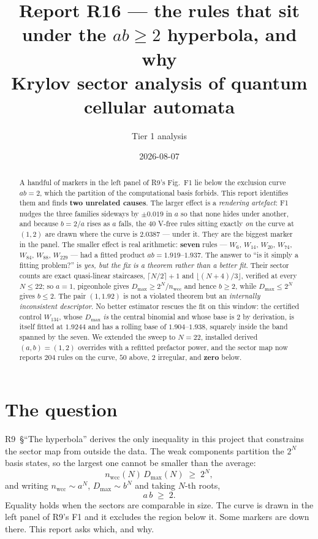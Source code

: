 \documentclass[11pt]{article}
\title{\textbf{Report R16 --- the rules that sit under the $ab\ge2$ hyperbola,
and why}\\
\large Krylov sector analysis of quantum cellular automata}
\author{Tier 1 analysis}
\date{2026-08-07}
\newcommand{\wcc}{\mathrm{wcc}}
\theoremstyle{plain}
\begin{document}
\maketitle

\begin{abstract}
A handful of markers in the left panel of R9's Fig.~F1 lie below the exclusion
curve $ab=2$, which the partition of the computational basis forbids. This report
identifies them and finds \textbf{two unrelated causes}. The larger effect is a
\emph{rendering artefact}: F1 nudges the three families sideways by $\pm0.019$ in
$a$ so that none hides under another, and because $b=2/a$ rises as $a$ falls, the
$40$ V-free rules sitting exactly \emph{on} the curve at $(1,2)$ are drawn where
the curve is $2.0387$ --- under it. They are the biggest marker in the panel. The
smaller effect is real arithmetic: \textbf{seven} rules --- $W_6$, $W_{14}$,
$W_{20}$, $W_{74}$, $W_{84}$, $W_{88}$, $W_{229}$ --- had a fitted product
$ab=1.919$--$1.937$. The answer to ``is it simply a fitting problem?'' is
\emph{yes, but the fix is a theorem rather than a better fit}. Their sector
counts are exact quasi-linear staircases, $\lceil N/2\rceil+1$ and
$\lfloor(N+4)/3\rfloor$, verified at every $N\le22$; so $a=1$, pigeonhole gives
$D_{\max}\ge2^N/n_\wcc$ and hence $b\ge2$, while $D_{\max}\le2^N$ gives $b\le2$.
The pair $(1,1.92)$ is not a violated theorem but an \emph{internally
inconsistent descriptor}. No better estimator rescues the fit on this window: the
certified control $W_{134}$, whose $D_{\max}$ \emph{is} the central binomial and
whose base is $2$ by derivation, is itself fitted at $1.9244$ and has a rolling
base of $1.904$--$1.938$, squarely inside the band spanned by the seven. We
extended the sweep to $N=22$, installed derived $(a,b)=(1,2)$ overrides with a
refitted prefactor power, and the sector map now reports $204$ rules on the
curve, $50$ above, $2$ irregular, and \textbf{zero} below.
\end{abstract}

\tableofcontents

\section{The question}

R9~\S``The hyperbola'' derives the only inequality in this project that
constrains the sector map from outside the data. The weak components partition
the $2^N$ basis states, so the largest one cannot be smaller than the average:
\begin{equation}
n_\wcc(N)\,D_{\max}(N)\;\ge\;2^N ,
\label{eq:finite}
\end{equation}
and writing $n_\wcc\sim a^N$, $D_{\max}\sim b^N$ and taking $N$-th roots,
\begin{equation}
a\,b\;\ge\;2 .
\label{eq:hyper}
\end{equation}
Equality holds when the sectors are comparable in size. The curve is drawn in the
left panel of R9's F1 and it excludes the region below it. Some markers are down
there. This report asks which, and why.
\end{document}
